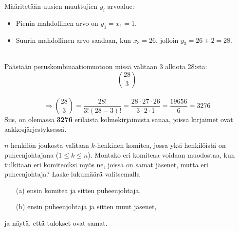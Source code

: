 \documentclass[12pt,a4paper]{article}
\begin{document}
Määritetään uusien muuttujien $y_i$ arvoalue:
\begin{itemize}
    \item Pienin mahdollinen arvo on $y_1 = x_1 = 1$.
    \item Suurin mahdollinen arvo saadaan, kun $x_3=26$, jolloin $y_3 = 26 + 2 = 28$.
\end{itemize}
\vspace{0.4cm}

\\

Päästään peruskombinaatiomuotoon missä valitaan 3 alkiota 28:sta:
\[
\binom{28}{3}
\]
\\
\[
\Rightarrow \binom{28}{3} = \frac{28!}{3!(28-3)!} = \frac{28 \cdot 27 \cdot 26}{3 \cdot 2 \cdot 1} = \frac{19656}{6} = 3276
\]
\vspace{0.5cm}
Siis, on olemassa \textbf{3276} erilaista kolmekirjaimista sanaa, joissa kirjaimet ovat aakkosjärjestyksessä.









\newpage
{}

$n$ henkilön joukosta valitaan $k$-henkinen komitea,
jossa yksi henkilöistä on puheenjohtajana ($1\leq k\leq n$). 
Montako eri komiteaa voidaan
muodostaa, kun tulkitaan eri komiteoiksi myös ne, joissa on samat
jäsenet, mutta eri puheenjohtaja? Laske lukumäärä valitsemalla
\begin{enumerate}
\item[(a)] ensin komitea ja sitten puheenjohtaja, 
\item[(b)] ensin puheenjohtaja ja sitten muut jäsenet,
\end{enumerate} 
ja näytä, että tulokset ovat samat.

\vspace{0.4cm}
\end{document}
